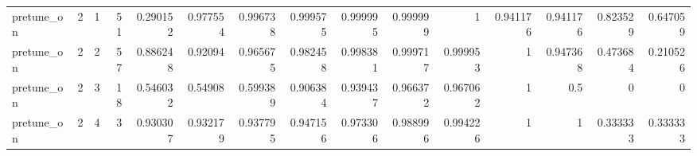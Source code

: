 \begin{table}[htbp]
\begin{tabular}{lrrrrrrrrrrrrrr}
pretune\_on & 2 & 1 & 51 & 0.290152 & 0.977554 & 0.996738 & 0.999575 & 0.999995 & 0.999999 & 1 & 0.941176 & 0.941176 & 0.823529 & 0.647059 \\
pretune\_on & 2 & 2 & 57 & 0.886248 & 0.92094 & 0.965675 & 0.982458 & 0.998381 & 0.999717 & 0.999953 & 1 & 0.947368 & 0.473684 & 0.210526 \\
pretune\_on & 2 & 3 & 18 & 0.546032 & 0.54908 & 0.599389 & 0.906384 & 0.939437 & 0.966372 & 0.967062 & 1 & 0.5 & 0 & 0 \\
pretune\_on & 2 & 4 & 3 & 0.930307 & 0.932179 & 0.937795 & 0.947156 & 0.973306 & 0.988996 & 0.994226 & 1 & 1 & 0.333333 & 0.333333 \\
\bottomrule
\end{tabular}
\end{table}
